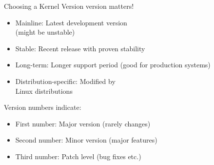 \begin{definition}{Choosing a Kernel Version} version matters!
    \begin{itemize}
        \item Mainline: Latest development version \\ (might be unstable)
        \item Stable: Recent release with proven stability
        \item Long-term: Longer support period (good for production systems)
        \item Distribution-specific: Modified by \\ Linux distributions
    \end{itemize}
    
    Version numbers indicate:
    \begin{itemize}
        \item First number: Major version (rarely changes)
        \item Second number: Minor version (major features)
        \item Third number: Patch level (bug fixes etc.)
    \end{itemize}
\end{definition}

\multend

